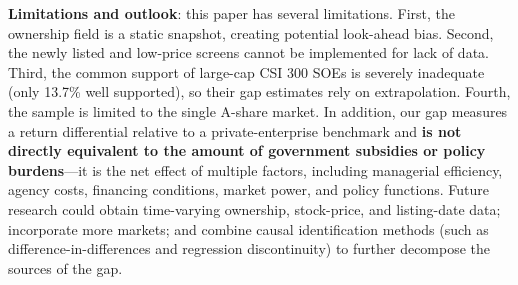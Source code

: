 \documentclass[11pt,a4paper]{article}
\begin{document}
\textbf{Limitations and outlook}: this paper has several limitations. First, the ownership field is a static snapshot, creating potential look-ahead bias. Second, the newly listed and low-price screens cannot be implemented for lack of data. Third, the common support of large-cap CSI 300 SOEs is severely inadequate (only 13.7\% well supported), so their gap estimates rely on extrapolation. Fourth, the sample is limited to the single A-share market. In addition, our gap measures a return differential relative to a private-enterprise benchmark and \textbf{is not directly equivalent to the amount of government subsidies or policy burdens}---it is the net effect of multiple factors, including managerial efficiency, agency costs, financing conditions, market power, and policy functions. Future research could obtain time-varying ownership, stock-price, and listing-date data; incorporate more markets; and combine causal identification methods (such as difference-in-differences and regression discontinuity) to further decompose the sources of the gap.
\end{document}
